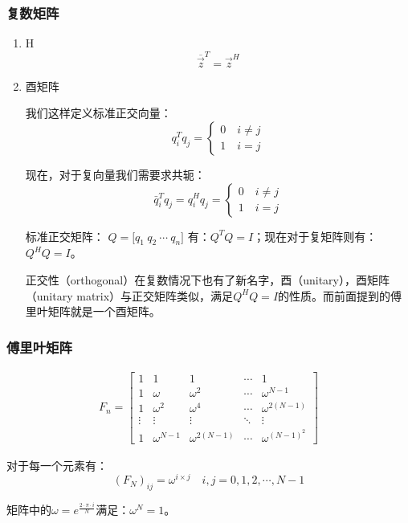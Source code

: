 \subsubsection{复数矩阵}
\begin{enumerate}
	\item H
	      \begin{equation}
		      \overline{\vec{z}}^T=\vec{z}^H
	      \end{equation}
	\item 酉矩阵

	      我们这样定义标准正交向量：
	      $$
		      q_i^Tq_j=\begin{cases}0\quad i\neq j\\1\quad i=j\end{cases}
	      $$

	      现在，对于复向量我们需要求共轭：
	      $$
		      \bar{q}_i^Tq_j=q_i^Hq_j=\begin{cases}0\quad i\neq j\\1\quad i=j\end{cases}
	      $$

	      标准正交矩阵：
	      $
		      Q=\Bigg[q_1\ q_2\ \cdots\ q_n\Bigg]
	      $
	      有：$Q^TQ=I$；现在对于复矩阵则有：$Q^HQ=I$。

	      正交性（orthogonal）在复数情况下也有了新名字，酉（unitary），酉矩阵（unitary matrix）与正交矩阵类似，满足$Q^HQ=I$的性质。而前面提到的傅里叶矩阵就是一个酉矩阵。
\end{enumerate}
\subsubsection{傅里叶矩阵}
\begin{align*}
	F_n=\begin{bmatrix}1&1&1&\cdots&1\\1&\omega &\omega ^2&\cdots&\omega ^{N-1}\\1&\omega ^2&\omega ^4&\cdots&\omega ^{2(N-1)}\\\vdots&\vdots&\vdots&\ddots&\vdots\\1&\omega ^{N-1}&\omega ^{2(N-1)}&\cdots&\omega ^{(N-1)^2}\end{bmatrix}
\end{align*}

对于每一个元素有：
\begin{equation}
	(F_N)_{ij}=\omega ^{i\times j}\quad i,j=0,1,2,\cdots,N-1
\end{equation}

矩阵中的$\omega=e^{\frac{2\cdot \pi\cdot i}{N}}$满足：$\omega ^N=1$。

